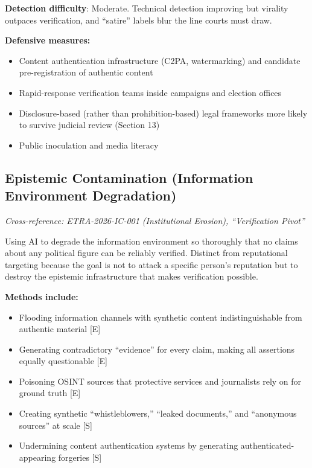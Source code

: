 \documentclass[11pt,letterpaper]{article}
\begin{document}
\textbf{Detection difficulty}: Moderate. Technical detection improving but virality outpaces verification, and ``satire'' labels blur the line courts must draw.

\textbf{Defensive measures:}
\begin{itemize}
  \item Content authentication infrastructure (C2PA, watermarking) and candidate pre-registration of authentic content
  \item Rapid-response verification teams inside campaigns and election offices
  \item Disclosure-based (rather than prohibition-based) legal frameworks more likely to survive judicial review (Section 13)
  \item Public inoculation and media literacy
\end{itemize}

\subsection{Epistemic Contamination (Information Environment Degradation)}

\textit{Cross-reference: ETRA-2026-IC-001 (Institutional Erosion), ``Verification Pivot''}

Using AI to degrade the information environment so thoroughly that no claims about any political figure can be reliably verified. Distinct from reputational targeting because the goal is not to attack a specific person's reputation but to destroy the epistemic infrastructure that makes verification possible.

\textbf{Methods include:}
\begin{itemize}
  \item Flooding information channels with synthetic content indistinguishable from authentic material [E]
  \item Generating contradictory ``evidence'' for every claim, making all assertions equally questionable [E]
  \item Poisoning OSINT sources that protective services and journalists rely on for ground truth [E]
  \item Creating synthetic ``whistleblowers,'' ``leaked documents,'' and ``anonymous sources'' at scale [S]
  \item Undermining content authentication systems by generating authenticated-appearing forgeries [S]
\end{itemize}
\end{document}
